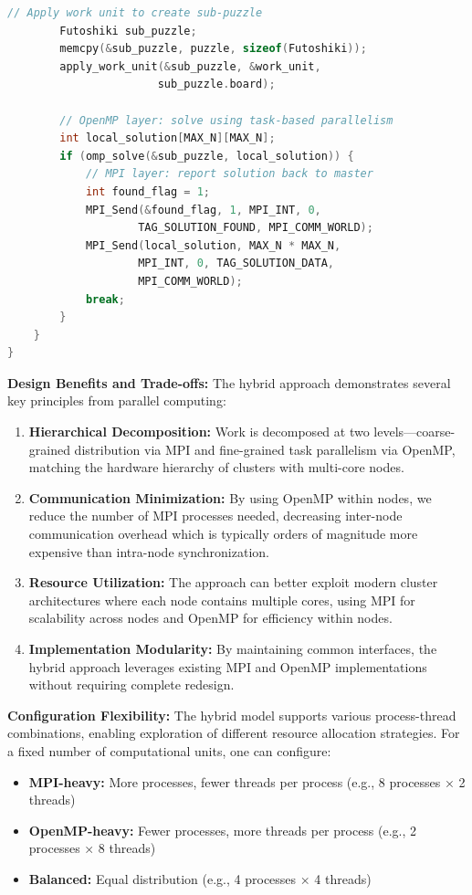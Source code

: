 \begin{enumerate}
\begin{lstlisting}[language=C, caption=Hybrid worker combining MPI and OpenMP, label={listing:hybrid_worker}]
        // Apply work unit to create sub-puzzle
        Futoshiki sub_puzzle;
        memcpy(&sub_puzzle, puzzle, sizeof(Futoshiki));
        apply_work_unit(&sub_puzzle, &work_unit, 
                       sub_puzzle.board);
        
        // OpenMP layer: solve using task-based parallelism
        int local_solution[MAX_N][MAX_N];
        if (omp_solve(&sub_puzzle, local_solution)) {
            // MPI layer: report solution back to master
            int found_flag = 1;
            MPI_Send(&found_flag, 1, MPI_INT, 0, 
                    TAG_SOLUTION_FOUND, MPI_COMM_WORLD);
            MPI_Send(local_solution, MAX_N * MAX_N, 
                    MPI_INT, 0, TAG_SOLUTION_DATA, 
                    MPI_COMM_WORLD);
            break;
        }
    }
}
\end{lstlisting}

\textbf{Design Benefits and Trade-offs:}
The hybrid approach demonstrates several key principles from parallel computing:

\begin{enumerate}
    \item \textbf{Hierarchical Decomposition:} Work is decomposed at two levels—coarse-grained distribution via MPI and fine-grained task parallelism via OpenMP, matching the hardware hierarchy of clusters with multi-core nodes.
    
    \item \textbf{Communication Minimization:} By using OpenMP within nodes, we reduce the number of MPI processes needed, decreasing inter-node communication overhead which is typically orders of magnitude more expensive than intra-node synchronization.
    
    \item \textbf{Resource Utilization:} The approach can better exploit modern cluster architectures where each node contains multiple cores, using MPI for scalability across nodes and OpenMP for efficiency within nodes.
    
    \item \textbf{Implementation Modularity:} By maintaining common interfaces, the hybrid approach leverages existing MPI and OpenMP implementations without requiring complete redesign.
\end{enumerate}

\textbf{Configuration Flexibility:}
The hybrid model supports various process-thread combinations, enabling exploration of different resource allocation strategies. For a fixed number of computational units, one can configure:
\begin{itemize}
    \item \textbf{MPI-heavy:} More processes, fewer threads per process (e.g., 8 processes × 2 threads)
    \item \textbf{OpenMP-heavy:} Fewer processes, more threads per process (e.g., 2 processes × 8 threads)  
    \item \textbf{Balanced:} Equal distribution (e.g., 4 processes × 4 threads)
\end{itemize}


\end{enumerate}
